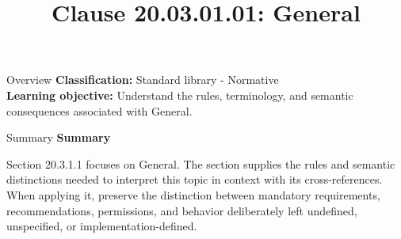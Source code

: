 \documentclass[10pt,letterpaper]{article}
\title{Clause 20.03.01.01: General}
\author{}
\date{}
\begin{document}
\maketitle
\begin{CornellOverviewBox}{Overview}
\textbf{Classification:} Standard library - Normative\\[2pt]
\textbf{Learning objective:} Understand the rules, terminology, and semantic consequences associated with General.
\end{CornellOverviewBox}\begin{CornellSummaryBox}{Summary}
{\sffamily\bfseries\color{Accent} Summary}\par\vspace{3pt}Section 20.3.1.1 focuses on General. The section supplies the rules and semantic distinctions needed to interpret this topic in context with its cross-references. When applying it, preserve the distinction between mandatory requirements, recommendations, permissions, and behavior deliberately left undefined, unspecified, or implementation-defined.
\end{CornellSummaryBox}
\end{document}
